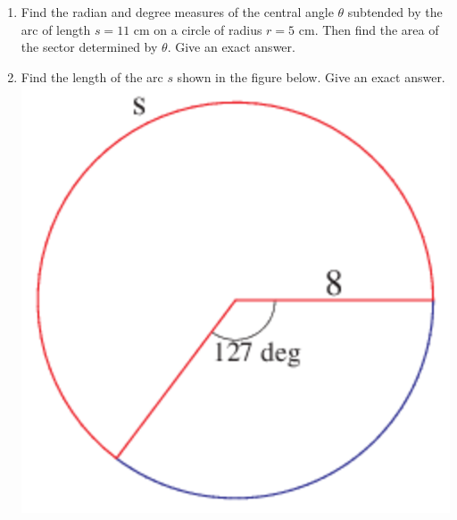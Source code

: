 \documentclass[11pt]{article}
\begin{document}
\begin{enumerate}
\item Find the radian and degree measures of the central angle $\theta$ subtended by the arc of length $s=11$ cm on a circle of radius $r=5$ cm.  Then find the area of the sector determined by $\theta.$  Give an exact answer.\vfill

\item Find the length of the arc $s$ shown in the figure below.  Give an exact answer.\vfil
\includegraphics[scale=.5]{redarc}



\end{enumerate}
\end{document}
